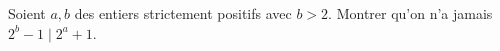 Soient $a, b$ des entiers strictement positifs avec $b > 2$. Montrer qu'on n'a jamais $2^b - 1 \mid 2^a + 1$.
